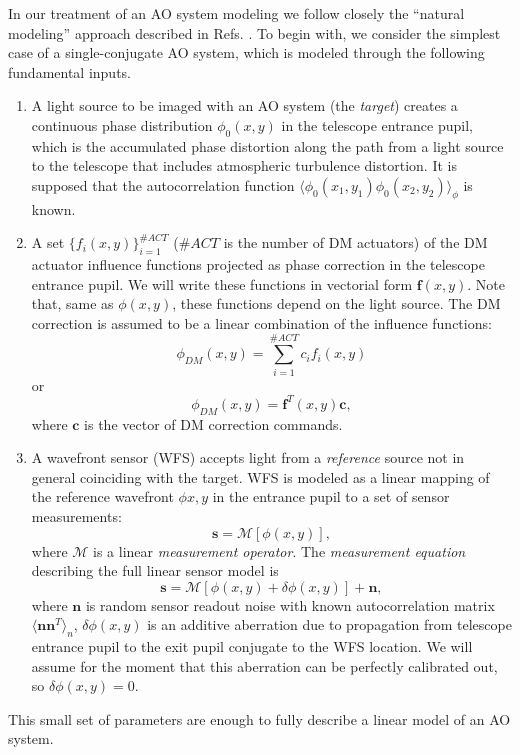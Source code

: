 In our treatment of an AO system modeling we follow closely the ``natural
modeling'' approach described in Refs.
\cite{WibergMaxGavel1,WibergMaxGavel2}. To begin with, we consider the simplest
case of a single-conjugate AO system, which is modeled through the following
fundamental inputs.
\begin{enumerate}
	\item A light source to be imaged with an AO system (the \emph{target})
	creates a continuous phase distribution $\phi_{0}(x,y)$ in the
  telescope entrance pupil,
	which is the accumulated phase distortion along the
  path from a light source to the telescope that includes atmospheric
  turbulence distortion. It is supposed that the
  autocorrelation function $\langle \phi_{0}(x_{1},y_{1}) \phi_{0}(x_{2},y_{2})
  \rangle_{\phi}$ is known.
  \item A set $\{ f_{i}(x,y) \}_{i=1}^{\#ACT}$ ($\#ACT$ is the number of DM
  actuators) of the DM actuator influence
  functions projected as phase correction in the telescope entrance pupil. We
  will write these functions in vectorial form $\bm{f}(x,y)$. Note that, same
  as $\phi(x,y)$, these functions depend on the light source. The DM
  correction is assumed to be a linear combination of the influence functions:
  \begin{equation} \label{eq:dm-phase-correction}
		\phi_{DM}(x,y) = \sum_{i=1}^{\#ACT} c_{i} f_{i}(x,y)
	\end{equation}
	or
	$$
	  \phi_{DM}(x,y) = \bm{f}^{T}(x,y) \bm{c},
	$$
	where $\bm{c}$ is the vector of DM correction commands.
  \item A wavefront sensor (WFS) accepts light from a \emph{reference} source
  not in general coinciding with the target. WFS is modeled as a linear
  mapping of the reference wavefront $\phi{x,y}$ in the entrance pupil to a
  set of sensor measurements:
  \begin{equation} \label{eq:wfs-measurement-operator}
    \bm{s} = \mathcal{M} [ \phi(x,y) ],
  \end{equation}
  where $\mathcal{M}$ is a linear \emph{measurement operator}.
   The \emph{measurement equation}
   describing the full linear sensor model is
  \begin{equation} \label{eq:measurement-equation}
	  \bm{s} = \mathcal{M} [ \phi(x,y) + \delta \phi(x,y) ] + \bm{n},
  \end{equation}
  where $\bm{n}$ is random sensor readout noise with known autocorrelation
  matrix $\langle \bm{n} \bm{n}^{T} \rangle_{n}$,
  $\delta \phi(x,y)$ is an additive aberration due to propagation from
  telescope entrance pupil to the exit pupil conjugate to the WFS location. We
  will assume for the moment that this aberration can be perfectly calibrated
  out, so $\delta \phi (x,y) = 0$.
\end{enumerate}
This small set of parameters are enough to fully describe a linear model of an
AO system.

